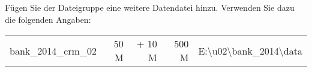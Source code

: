 \item Fügen Sie der Dateigruppe  eine weitere Datendatei
hinzu. Verwenden Sie dazu die folgenden Angaben:
\begin{center}
  \begin{small}
    \tablehead{
    }
    \tabletail {
    }
    \tablelasttail {
    }
    \begin{supertabular}{lrrrl}
      bank\_2014\_crm\_02 & 50 M &  + 10 M & 500 M &
      E:\textbackslash u02\textbackslash bank\_2014\textbackslash data \\
    \end{supertabular}
  \end{small}
\end{center}
